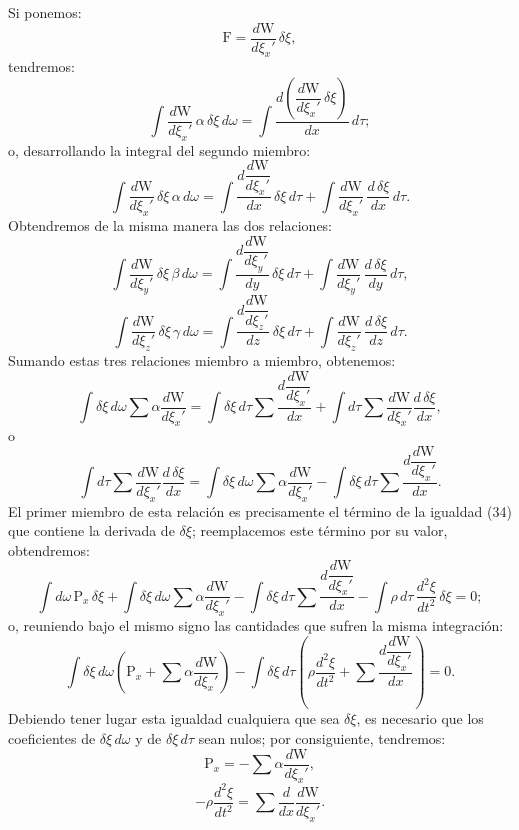 Si ponemos:
\[
\mathrm{F}=\frac{d\mathrm{W}}{d\xi_x'}\,\delta\xi,
\]
tendremos:
\[
\int \frac{d\mathrm{W}}{d\xi_x'}\,\alpha\,\delta\xi\,d\omega
=\int \frac{d\left(\dfrac{d\mathrm{W}}{d\xi_x'}\,\delta\xi\right)}{dx}\,d\tau;
\]
o, desarrollando la integral del segundo miembro:
\[
\int \frac{d\mathrm{W}}{d\xi_x'}\,\delta\xi\,\alpha\,d\omega
=\int \frac{d\dfrac{d\mathrm{W}}{d\xi_x'}}{dx}\,\delta\xi\,d\tau
+\int \frac{d\mathrm{W}}{d\xi_x'}\,\frac{d\,\delta\xi}{dx}\,d\tau.
\]
Obtendremos de la misma manera las dos relaciones:
\[
\int \frac{d\mathrm{W}}{d\xi_y'}\,\delta\xi\,\beta\,d\omega
=\int \frac{d\dfrac{d\mathrm{W}}{d\xi_y'}}{dy}\,\delta\xi\,d\tau
+\int \frac{d\mathrm{W}}{d\xi_y'}\,\frac{d\,\delta\xi}{dy}\,d\tau,
\]
\[
\int \frac{d\mathrm{W}}{d\xi_z'}\,\delta\xi\,\gamma\,d\omega
=\int \frac{d\dfrac{d\mathrm{W}}{d\xi_z'}}{dz}\,\delta\xi\,d\tau
+\int \frac{d\mathrm{W}}{d\xi_z'}\,\frac{d\,\delta\xi}{dz}\,d\tau.
\]
Sumando estas tres relaciones miembro a miembro, obtenemos:
\[
\int \delta\xi\,d\omega\sum\alpha\frac{d\mathrm{W}}{d\xi_x'}
=\int \delta\xi\,d\tau\sum\frac{d\dfrac{d\mathrm{W}}{d\xi_x'}}{dx}
+\int d\tau\sum\frac{d\mathrm{W}}{d\xi_x'}\frac{d\,\delta\xi}{dx},
\]
o
\[
\int d\tau\sum\frac{d\mathrm{W}}{d\xi_x'}\frac{d\,\delta\xi}{dx}
=\int \delta\xi\,d\omega\sum\alpha\frac{d\mathrm{W}}{d\xi_x'}
-\int \delta\xi\,d\tau\sum\frac{d\dfrac{d\mathrm{W}}{d\xi_x'}}{dx}.
\]
El primer miembro de esta relación es precisamente el término de la
igualdad (34) que contiene la derivada de $\delta\xi$; reemplacemos este
término por su valor, obtendremos:
\[
\int d\omega\,\mathrm{P}_x\,\delta\xi+\int \delta\xi\,d\omega\sum\alpha\frac{d\mathrm{W}}{d\xi_x'}
-\int \delta\xi\,d\tau\sum\frac{d\dfrac{d\mathrm{W}}{d\xi_x'}}{dx}
-\int \rho\,d\tau\,\frac{d^2\xi}{dt^2}\,\delta\xi=0;
\]
o, reuniendo bajo el mismo signo las cantidades que sufren la misma
integración:
\[
\int \delta\xi\,d\omega\left(\mathrm{P}_x+\sum\alpha\frac{d\mathrm{W}}{d\xi_x'}\right)
-\int \delta\xi\,d\tau\left(\rho\frac{d^2\xi}{dt^2}+\sum\frac{d\dfrac{d\mathrm{W}}{d\xi_x'}}{dx}\right)=0.
\]
Debiendo tener lugar esta igualdad cualquiera que sea $\delta\xi$, es
necesario que los coeficientes de $\delta\xi\,d\omega$ y de
$\delta\xi\,d\tau$ sean nulos; por consiguiente, tendremos:
\begin{equation}
\mathrm{P}_x=-\sum\alpha\frac{d\mathrm{W}}{d\xi_x'},
\tag{35}
\end{equation}
\begin{equation}
-\rho\frac{d^2\xi}{dt^2}=\sum\frac{d}{dx}\frac{d\mathrm{W}}{d\xi_x'}.
\tag{36}
\end{equation}

